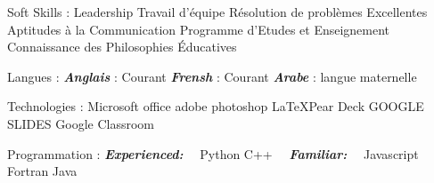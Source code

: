

\begin{cvskills}



\cvskill
{Soft Skills :} %
{Leadership   \cpshalf 	Travail d'équipe  \cpshalf 	Résolution de problèmes   \cpshalf	Excellentes Aptitudes à la Communication \cpshalf	Programme \newline d’Etudes et Enseignement \cpshalf Connaissance des Philosophies Éducatives
} %


\cvskill
{Langues :} %
{\textbf{\emph{Anglais}} : Courant \cpshalf \textbf{\emph{Frensh}} : Courant \cpshalf \textbf{\emph{Arabe}} : langue maternelle} %




\cvskill
{Technologies :} %
{Microsoft office  \cpshalf  adobe photoshop  \cpshalf  \LaTeX \cpshalf Pear Deck \cpshalf	GOOGLE SLIDES \cpshalf Google Classroom
} %

\cvskill
{Programmation :} %
{\textbf{\emph{Experienced:}} \ \ Python \cpshalf C++ \ \ \textbf{\emph{Familiar:}} \ \ Javascript \cpshalf Fortran \cpshalf Java} %


%
%
%
%


\end{cvskills}
